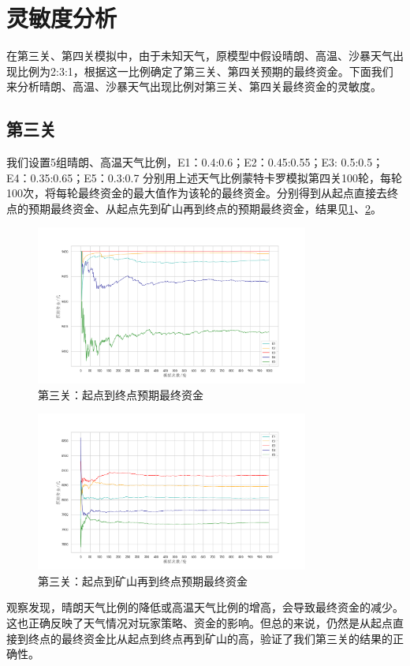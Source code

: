 \documentclass[withoutpre]{cumcmthesis} %
\begin{document}
\section{灵敏度分析}
在第三关、第四关模拟中，由于未知天气，原模型中假设晴朗、高温、沙暴天气出现比例为2:3:1，根据这一比例确定了第三关、第四关预期的最终资金。下面我们来分析晴朗、高温、沙暴天气出现比例对第三关、第四关最终资金的灵敏度。

\subsection{第三关}
我们设置5组晴朗、高温天气比例，E1：0.4:0.6；E2：0.45:0.55；E3: 0.5:0.5；E4：0.35:0.65；E5：0.3:0.7
分别用上述天气比例蒙特卡罗模拟第四关100轮，每轮100次，将每轮最终资金的最大值作为该轮的最终资金。分别得到从起点直接去终点的预期最终资金、从起点先到矿山再到终点的预期最终资金，结果见\cref{fig:analysis3map1}、\cref{fig:analysis3map2}。
\begin{figure}[H]
    \centering
    \includegraphics[width=0.8\textwidth]{figures/analysis3map1.png}
    \caption{第三关：起点到终点预期最终资金}
    \label{fig:analysis3map1}
\end{figure}


\begin{figure}[H]
    \centering
    \includegraphics[width=0.8\textwidth]{figures/analysis3map2.png}
    \caption{第三关：起点到矿山再到终点预期最终资金}
    \label{fig:analysis3map2}
\end{figure}
观察发现，晴朗天气比例的降低或高温天气比例的增高，会导致最终资金的减少。这也正确反映了天气情况对玩家策略、资金的影响。但总的来说，仍然是从起点直接到终点的最终资金比从起点到终点再到矿山的高，验证了我们第三关的结果的正确性。
\end{document}

